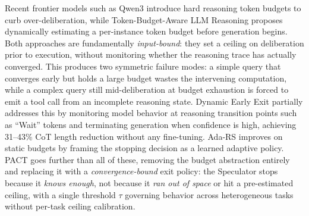 \documentclass[letterpaper,twocolumn,10pt]{article}
\begin{document}
Recent frontier models such as Qwen3 \cite{qwen3} introduce hard reasoning token budgets 
to curb over-deliberation, while Token-Budget-Aware LLM Reasoning \cite{han2024tokenbudget} 
proposes dynamically estimating a per-instance token budget before generation begins. 
Both approaches are fundamentally \textit{input-bound}: they set a ceiling on deliberation 
prior to execution, without monitoring whether the reasoning trace has actually converged. 
This produces two symmetric failure modes: a simple query that converges early but holds 
a large budget wastes the intervening computation, while a complex query still 
mid-deliberation at budget exhaustion is forced to emit a tool call from an incomplete 
reasoning state. Dynamic Early Exit \cite{dynamicexit2025} partially addresses this by 
monitoring model behavior at reasoning transition points such as ``Wait'' tokens and 
terminating generation when confidence is high, achieving 31--43\% CoT length reduction 
without any fine-tuning. Ada-RS \cite{nair2026adars} improves on static budgets by 
framing the stopping decision as a learned adaptive policy. PACT goes further than all 
of these, removing the budget abstraction entirely and replacing it with a 
\textit{convergence-bound} exit policy: the Speculator stops because it 
\textit{knows enough}, not because it \textit{ran out of space} or hit a 
pre-estimated ceiling, with a single threshold $\tau$ governing behavior across 
heterogeneous tasks without per-task ceiling calibration.
\end{document}
